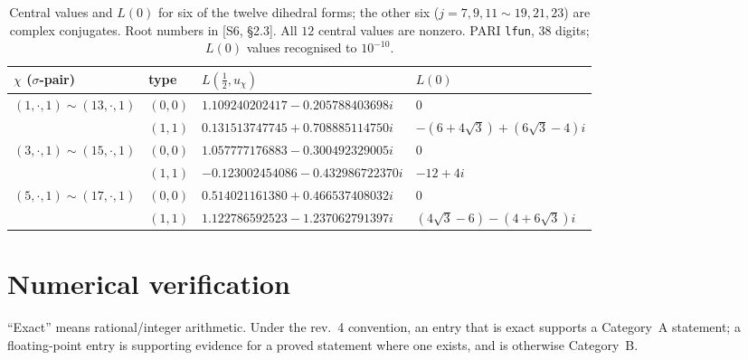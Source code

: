 \documentclass[11pt]{article}
\theoremstyle{definition}
\theoremstyle{plain}
\newcommand{\src}[1]{\textup{[S#1]}}
\begin{document}
\begin{table}[ht]\centering\small
\begin{tabular}{llll}\toprule
$\chi$ ($\sigma$-pair) & type & $L(\tfrac12,u_\chi)$ & $L(0)$\\\midrule
$(1,\cdot,1)\sim(13,\cdot,1)$ & $(0,0)$ & $1.109240202417-0.205788403698i$ & $0$\\
 & $(1,1)$ & $0.131513747745+0.708885114750i$ & $-(6+4\sqrt3)+(6\sqrt3-4)i$\\
$(3,\cdot,1)\sim(15,\cdot,1)$ & $(0,0)$ & $1.057777176883-0.300492329005i$ & $0$\\
 & $(1,1)$ & $-0.123002454086-0.432986722370i$ & $-12+4i$\\
$(5,\cdot,1)\sim(17,\cdot,1)$ & $(0,0)$ & $0.514021161380+0.466537408032i$ & $0$\\
 & $(1,1)$ & $1.122786592523-1.237062791397i$ & $(4\sqrt3-6)-(4+6\sqrt3)i$\\\bottomrule
\end{tabular}
\caption{Central values and $L(0)$ for six of the twelve dihedral forms; the other six ($j=7,9,11\sim19,21,23$) are complex conjugates. Root numbers in
\src{6, \S2.3}. All $12$ central values are nonzero. PARI \texttt{lfun}, 38 digits; $L(0)$ values recognised to $10^{-10}$.}\label{tab:L}
\end{table}

\section{Numerical verification}\label{sec:num}
``Exact'' means rational/integer arithmetic. Under the rev.~4 convention, an entry that is exact supports a Category~A statement; a floating-point entry
is supporting evidence for a proved statement where one exists, and is otherwise Category~B.
\end{document}
